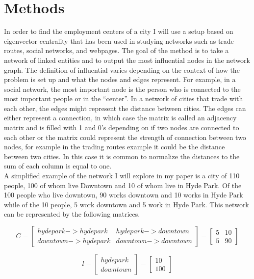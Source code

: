 \documentclass{article}
\begin{document}
\section{Methods}
In order to find the employment centers of a city I will use a setup based on eigenvector centrality that has been used in studying networks such as trade routes, social networks, and webpages.  The goal of the method is to take a network of linked entities and to output the most influential nodes in the network graph.  The definition of influential varies depending on the context of how the problem is set up and what the nodes and edges represent.  For example, in a social network, the most important node is the person who is connected to the most important people or in the “center”.  In a network of cities that trade with each other, the edges might represent the distance between cities.  The edges can either represent a connection, in which case the matrix is called an adjacency matrix and is filled with 1 and 0’s depending on if two nodes are connected to each other or the matrix could represent the strength of connection between two nodes, for example in the trading routes example it could be the distance between two cities.  In this case it is common to normalize the distances to the sum of each column is equal to one. \\

A simplified example of the network I will explore in my paper is a city of 110 people, 100 of whom live Downtown and 10 of whom live in Hyde Park.  Of the 100 people who live downtown, 90 works downtown and 10 works in Hyde Park while of the 10 people, 5 work downtown and 5 work in Hyde Park.  This network can be represented by the following matrices. 

\begin{equation}
      C
   =
  \begin{bmatrix}
    hyde park->hyde park  & hyde park->downtown\\
    downtown->hyde park  & downtown->downtown
    
  \end{bmatrix} = 
  \begin{bmatrix}
    5 & 10\\
    5 & 90 
  \end{bmatrix}
\end{equation}

\begin{equation}
      l
   =
  \begin{bmatrix}
    hyde park\\
    downtown
    
  \end{bmatrix} = 
  \begin{bmatrix}
    10\\
    100 
  \end{bmatrix}
\end{equation}
\end{document}
